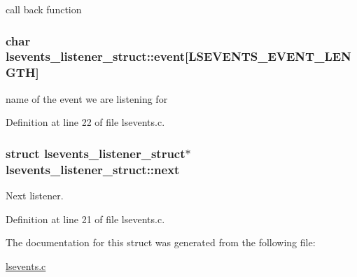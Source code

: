 call back function \hypertarget{structlsevents__listener__struct_a270117dccadeda0164592c753dae15a1}{
\subsubsection[{event}]{\setlength{\rightskip}{0pt plus 5cm}char {\bf lsevents\_\-listener\_\-struct::event}\mbox{[}LSEVENTS\_\-EVENT\_\-LENGTH\mbox{]}}}
\label{structlsevents__listener__struct_a270117dccadeda0164592c753dae15a1}


name of the event we are listening for 

Definition at line 22 of file lsevents.c.\hypertarget{structlsevents__listener__struct_a8aed9196b0deab84e018b96c0cc59305}{
\subsubsection[{next}]{\setlength{\rightskip}{0pt plus 5cm}struct {\bf lsevents\_\-listener\_\-struct}$\ast$ {\bf lsevents\_\-listener\_\-struct::next}}}
\label{structlsevents__listener__struct_a8aed9196b0deab84e018b96c0cc59305}


Next listener. 

Definition at line 21 of file lsevents.c.

The documentation for this struct was generated from the following file:\begin{DoxyCompactItemize}
\item 
\hyperlink{lsevents_8c}{lsevents.c}\end{DoxyCompactItemize}
